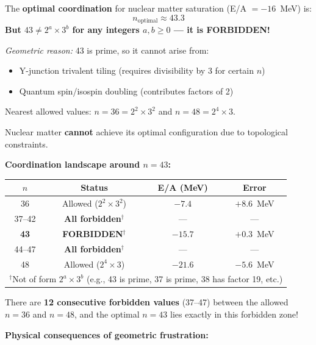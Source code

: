 \begin{tcolorbox}[colback=red!5!white, colframe=red!75!black, title=Critical Observation: Geometric Frustration {[P]}]
The \textbf{optimal coordination} for nuclear matter saturation (E/A $= -16$~MeV) is:
\[
n_{\text{optimal}} \approx 43.3
\]
\textbf{But $43 \neq 2^a \times 3^b$ for any integers $a, b \geq 0$ --- it is FORBIDDEN!}

\emph{Geometric reason:} 43 is prime, so it cannot arise from:
\begin{itemize}
    \item Y-junction trivalent tiling (requires divisibility by 3 for certain $n$)
    \item Quantum spin/isospin doubling (contributes factors of 2)
\end{itemize}
Nearest allowed values: $n = 36 = 2^2 \times 3^2$ and $n = 48 = 2^4 \times 3$.

Nuclear matter \textbf{cannot} achieve its optimal configuration due to topological constraints.
\end{tcolorbox}

\textbf{Coordination landscape around $n = 43$:}

\begin{center}
\begin{tabular}{cccc}
\hline
$n$ & Status & E/A (MeV) & Error \\
\hline
36 & Allowed ($2^2 \times 3^2$) & $-7.4$ & $+8.6$~MeV \\
37--42 & \textbf{All forbidden}$^\dagger$ & --- & --- \\
\textbf{43} & \textbf{FORBIDDEN}$^\dagger$ & $-15.7$ & $+0.3$~MeV \\
44--47 & \textbf{All forbidden}$^\dagger$ & --- & --- \\
48 & Allowed ($2^4 \times 3$) & $-21.6$ & $-5.6$~MeV \\
\multicolumn{4}{l}{\footnotesize $^\dagger$Not of form $2^a \times 3^b$ (e.g., 43 is prime, 37 is prime, 38 has factor 19, etc.)} \\
\hline
\end{tabular}
\end{center}

There are \textbf{12 consecutive forbidden values} (37--47) between the allowed $n = 36$ and $n = 48$, and the optimal $n = 43$ lies exactly in this forbidden zone!

\textbf{Physical consequences of geometric frustration:}

